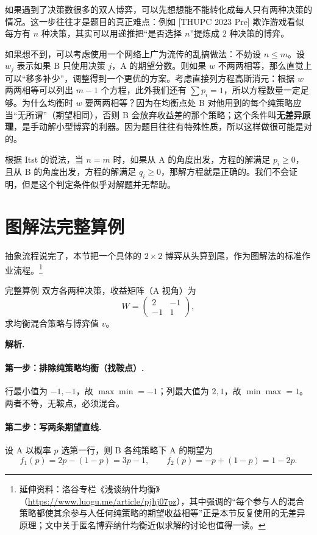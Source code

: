 \documentclass[UTF8,a4paper,11pt,oneside,openany,fontset=fandol]{ctexbook}
\theoremstyle{definition}
\newcommand{\sol}{\par\noindent\textbf{解析.}\ }
\begin{document}
如果遇到了决策数很多的双人博弈，可以先想想能不能转化成每人只有两种决策的情况。这一步往往才是题目的真正难点：例如 [THUPC 2023 Pre] 欺诈游戏看似每方有 $n$ 种决策，其实可以用递推把“是否选择 $n$”提炼成 $2$ 种决策的博弈。

如果想不到，可以考虑使用一个网络上广为流传的乱搞做法：不妨设 $n\le m$。设 $w_j$ 表示如果 B 只使用决策 $j$，A 的期望分数。则如果 $w$ 不两两相等，那么直觉上可以“移多补少”，调整得到一个更优的方案。考虑直接列方程高斯消元：根据 $w$ 两两相等可以列出 $m-1$ 个方程，此外我们还有 $\sum p_i=1$，所以方程数量一定足够。为什么均衡时 $w$ 要两两相等？因为在均衡点处 B 对他用到的每个纯策略应当“无所谓”（期望相同），否则 B 会放弃收益差的那个策略；这个条件叫\textbf{无差异原理}，是手动解小型博弈的利器。因为题目往往有特殊性质，所以这样做很可能是对的。

根据 Itst 的说法，当 $n=m$ 时，如果从 A 的角度出发，方程的解满足 $p_i\ge0$，且从 B 的角度出发，方程的解满足 $q_i\ge0$，那解方程就是正确的。我们不会证明，但是这个判定条件似乎对解题并无帮助。

\section{图解法完整算例}
抽象流程说完了，本节把一个具体的 $2\times2$ 博弈从头算到尾，作为图解法的标准作业流程。\footnote{延伸资料：洛谷专栏《浅谈纳什均衡》（\url{https://www.luogu.me/article/pjhj07pz}），其中强调的“每个参与人的混合策略都使其余参与人任何纯策略的期望收益相等”正是本节反复使用的无差异原理；文中关于匿名博弈纳什均衡近似求解的讨论也值得一读。}

\begin{problem}{完整算例}
双方各两种决策，收益矩阵（A 视角）为
\[
 W=\begin{pmatrix}2&-1\\-1&1\end{pmatrix},
\]
求均衡混合策略与博弈值 $v$。
\end{problem}

\sol \paragraph{第一步：排除纯策略均衡（找鞍点）.} 行最小值为 $-1,-1$，故 $\max\min=-1$；列最大值为 $2,1$，故 $\min\max=1$。两者不等，无鞍点，必须混合。

\paragraph{第二步：写两条期望直线.} 设 A 以概率 $p$ 选第一行，则 B 各纯策略下 A 的期望为
\[
 f_1(p)=2p-(1-p)=3p-1,\qquad f_2(p)=-p+(1-p)=1-2p .
\]
\end{document}
